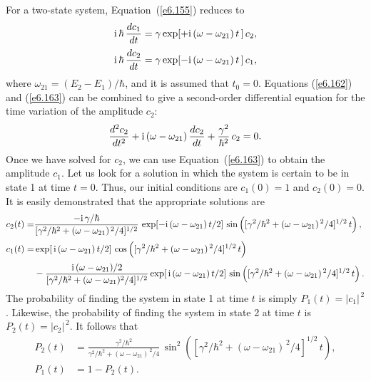 For a two-state system, Equation~(\ref{e6.155}) reduces to
\begin{align}\label{e6.162}
{\rm i} \,\hbar\, \frac{d c_1}{dt} &= \gamma \exp[+{\rm i}\,
(\omega-\omega_{21})\,t\,]\,c_2,\\[0.5ex]
{\rm i}\,\hbar\, \frac{d c_2}{dt} &= \gamma  \exp[-{\rm i}\,
(\omega-\omega_{21})\,t\,]\,c_1,\label{e6.163}
\end{align}
where $\omega_{21}  = (E_2 - E_1)/\hbar$, and it is assumed that $t_0=0$. Equations (\ref{e6.162}) and 
(\ref{e6.163}) can be combined to give a second-order differential equation
for the time variation of the amplitude $c_2$:
\begin{equation}
\frac{d^2 c_2}{dt^2} + {\rm i}\,(\omega-\omega_{21})\,\frac{d c_2}{dt} + 
\frac{\gamma^2}{\hbar^2} \,c_2 = 0.
\end{equation}
Once we have solved for $c_2$, we can use Equation~(\ref{e6.163}) to obtain the 
amplitude $c_1$. Let us look for a solution in which the system is
certain to be in state 1 at time $t=0$. Thus, our initial 
conditions are $c_1(0) = 1$ and $c_2(0) = 0$. It is easily
demonstrated that the appropriate solutions are
\begin{align}
c_2(t) =& \frac{-{\rm i}\, \gamma/\hbar}
{[\gamma^2/\hbar^2 + (\omega-\omega_{21})^{\,2}/4]^{1/2}}\,
\exp[-{\rm i}\,(\omega-\omega_{21})\,t/2]\,\sin\left([\gamma^2/\hbar^2+(\omega-\omega_{21})^{\,2}/4]^{1/2}\,t\right),
\\[0.5ex]
c_1(t)=& \exp[\,{\rm i}\,(\omega-\omega_{21})\,t/2]\,\cos\left(
[\gamma^2/\hbar^2+(\omega-\omega_{21})^{\,2}/4]^{1/2}\,t\right)\nonumber\\[0.5ex]
&- \frac{{\rm i}\,(\omega-\omega_{21})/2 }{[\gamma^2/\hbar^2 + 
(\omega-\omega_{21})^2/4]^{1/2}} \exp[\,{\rm i}\,(\omega-\omega_{21})\,t/2]\,\sin\left(
[\gamma^2/\hbar^2+(\omega-\omega_{21})^{\,2}/4]^{1/2}\,t\right).
\end{align}
The probability of finding the system in state 1 at time $t$ is
simply $P_1(t) = |c_1|^{\,2}$. Likewise, the probability of finding the
system in state 2 at time $t$ is $P_2(t) = |c_2|^{\,2}$. 
It follows that
\begin{align}\label{e6.167}
P_2(t) &= \frac{\gamma^2/\hbar^2}{ \gamma^2/\hbar^2 + 
(\omega-\omega_{21})^{\,2}/4}\,  \sin^2\left([\gamma^2/\hbar^2+
(\omega-\omega_{21})^{\,2}/4]^{1/2}\,t\right),\\[0.5ex]
P_1(t) &= 1 - P_2(t).
\end{align}

